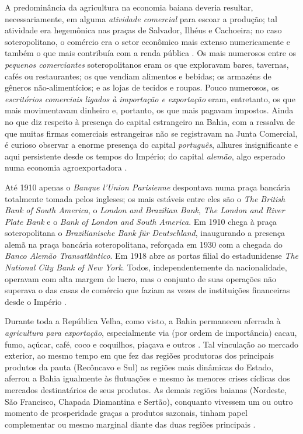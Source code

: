 A predominância da agricultura na economia baiana deveria resultar, necessariamente, em alguma \textit{atividade comercial} para escoar a produção; tal atividade era hegemônica nas praças de Salvador, Ilhéus e Cachoeira; no caso soteropolitano, o comércio era o setor econômico mais extenso numericamente e também o que mais contribuía com a renda pública \cite[p.~55]{CPE1980}. Os mais numerosos entre os \textit{pequenos comerciantes} soteropolitanos eram os que exploravam bares, tavernas, cafés ou restaurantes; os que vendiam alimentos e bebidas; os armazéns de gêneros não-alimentícios; e as lojas de tecidos e roupas. Pouco numerosos, os \textit{escritórios comerciais ligados à importação e exportação} eram, entretanto, os que mais movimentavam dinheiro e, portanto, os que mais pagavam impostos. Ainda no que diz respeito à presença do capital estrangeiro na Bahia, com a ressalva de que muitas firmas comerciais estrangeiras não se registravam na Junta Comercial, é curioso observar a enorme presença do capital \textit{português}, alhures insignificante e aqui persistente desde os tempos do Império; do capital \textit{alemão}, algo esperado numa economia agroexportadora \cite[p.~69-70]{CPE1980}. 

Até 1910 apenas o \textit{Banque l'Union Parisienne} despontava numa praça bancária totalmente tomada pelos ingleses; os mais estáveis entre eles são o \textit{The British Bank of South America}, o \textit{London and Brazilian Bank}, \textit{The London and River Plate Bank} e o \textit{Bank of London and South America}. Em 1910 chega à praça soteropolitana o \textit{Brazilianische Bank für Deutschland}, inaugurando a presença alemã na praça bancária soteropolitana, reforçada em 1930  com a chegada do \textit{Banco Alemão Transatlântico}. Em 1918 abre as portas filial do estadunidense \textit{The National City Bank of New York}. Todos, independentemente da nacionalidade, operavam com alta margem de lucro, mas o conjunto de suas operações não superava o das casas de comércio que faziam as vezes de instituições financeiras desde o Império \cite[p.~55]{CPE1980}.

Durante toda a República Velha, como visto, a Bahia permaneceu aferrada à \textit{agricultura para exportação}, especialmente via (por ordem de importância) cacau, fumo, açúcar, café, coco e coquilhos, piaçava e outros \cite[p.~77;110]{CPE1980}. Tal vinculação ao mercado exterior, ao mesmo tempo em que fez das regiões produtoras dos principais produtos da pauta (Recôncavo e Sul) as regiões mais dinâmicas do Estado, aferrou a Bahia igualmente às flutuações e mesmo às menores crises cíclicas dos mercados destinatários de seus produtos. As demais regiões baianas (Nordeste, São Francisco, Chapada Diamantina e Sertão), conquanto vivessem um ou outro momento de prosperidade graças a produtos sazonais, tinham papel complementar ou mesmo marginal diante das duas regiões principais \cite[p.~77]{CPE1980}.

